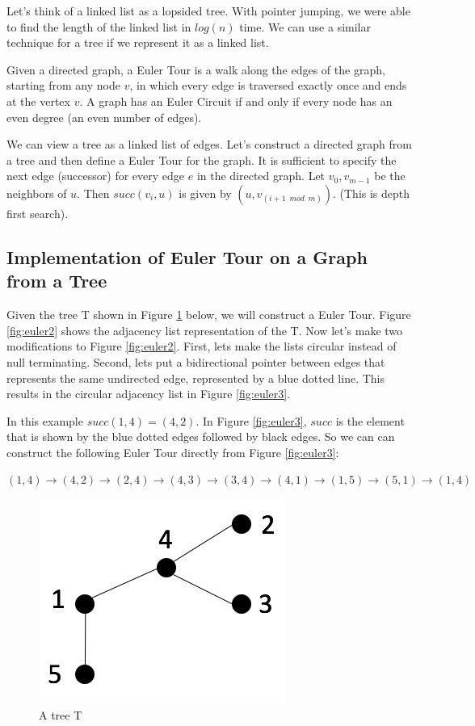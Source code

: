 \documentclass[twoside]{article}
\begin{document}
Let's think of a linked list as a lopsided tree.  With pointer jumping, we were able to find the length of the linked list in $log(n)$ time.  We can use a similar technique for a tree if we represent it as a linked list.

Given a directed graph, a Euler Tour is a walk along the edges of the graph, starting from any node $v$, in which every edge is traversed exactly once and ends at the vertex $v$.  A graph has an Euler Circuit if and only if every node has an even degree (an even number of edges).

We can view a tree as a linked list of edges.  Let's construct a directed graph from a tree and then define a Euler Tour for the graph.  It is sufficient to specify  the next edge (successor) for every edge $e$ in the directed graph.  Let $v_0 , v_{m-1}$ be the neighbors of $u$.  Then $succ(v_i, u)$ is given by $(u, v_{(i+1\enspace mod\enspace m)})$.  (This is depth first search).

\subsection{Implementation of Euler Tour on a Graph from a Tree} 

Given the tree T shown in Figure \ref{fig:euler1} below, we will construct a Euler Tour.  Figure \ref{fig:euler2} shows the adjacency list representation of the T.  Now let's make two modifications to Figure \ref{fig:euler2}.  First, lets make the lists circular instead of null terminating.  Second, lets put a bidirectional pointer between edges that represents the same undirected edge, represented by a blue dotted line.  This results in the circular adjacency list in Figure \ref{fig:euler3}. 

In this example $succ(1,4) = (4,2)$.  In Figure \ref{fig:euler3}, $succ$ is the element that is shown by the blue dotted edges followed by black edges.  So we can can construct the following Euler Tour directly from Figure \ref{fig:euler3}:

$(1, 4) \rightarrow (4, 2) \rightarrow (2, 4) \rightarrow (4, 3) \rightarrow (3, 4) \rightarrow (4, 1) \rightarrow (1, 5) \rightarrow (5, 1) \rightarrow (1, 4)$

\begin{figure}[!ht]
\centering
\includegraphics[scale=0.6]{img/EulerCkt1.png}
\caption{A tree T} \label{fig:euler1} 
\end{figure}
\end{document}
